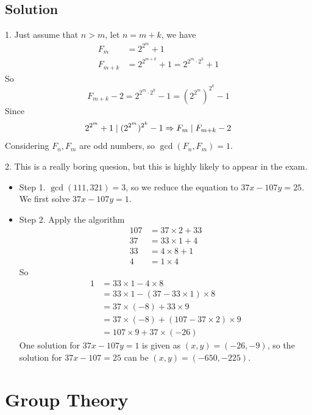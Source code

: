\documentclass[12pt]{article}
\begin{document}
	\subsection{Solution}
	1. Just assume that $n>m$, let $n = m+k$, we have
	\begin{equation*}
		\begin{aligned}
			F_m &= 2^{2^m}+1 \\
			F_{m+k} & = 2^{2^{m+k}}+1 = 2^{2^m \cdot 2^k}+1
		\end{aligned}
	\end{equation*}
	So 
	$$
		F_{m+k}-2 = 2^{2^m \cdot 2^k} -1 = (2^{2^m})^{2^k}-1
	$$
	Since 
	$$
		2^{2^m} + 1 \mid (2^{2^m}) ^ {2^k} -1 \Rightarrow F_m \mid F_{m+k} -2
	$$
	Considering $F_n,F_m$ are odd numbers, so $\gcd(F_n,F_m)=1$.
	\par 
	2. This is a really boring quesion, but this is highly likely to appear
	in the exam.
	\begin{itemize}
		\item Step 1. $\gcd(111,321) = 3$, so we reduce the equation to $37 x - 107 y = 25$. We first 
		solve $37x-107y=1$.
		\item Step 2. Apply the algorithm 
			\begin{equation*}
				\begin{aligned}
					107 &= 37 \times 2 + 33 \\
					37  &= 33 \times 1 + 4  \\
					33  &= 4  \times 8 + 1  \\	
					4   &= 1  \times 4
				\end{aligned}
			\end{equation*}
			So 
			\begin{equation*}
				\begin{aligned}
					1 &= 33 \times 1 - 4 \times 8 \\ 
					  &= 33 \times 1 - (37 - 33 \times 1) \times 8 \\
					  &= 37 \times (-8) + 33 \times 9 \\
					  &= 37 \times (-8) + (107-37 \times 2) \times 9 \\
					  &= 107 \times 9 + 37 \times (-26)
				\end{aligned}
			\end{equation*}
			One solution for $37x-107y=1$ is given as $(x,y)=(-26,-9)$, 
			so the solution for $37x-107=25$ can be $(x,y) = (-650,-225)$.
	\end{itemize}
	\section{Group Theory}
\end{document}
